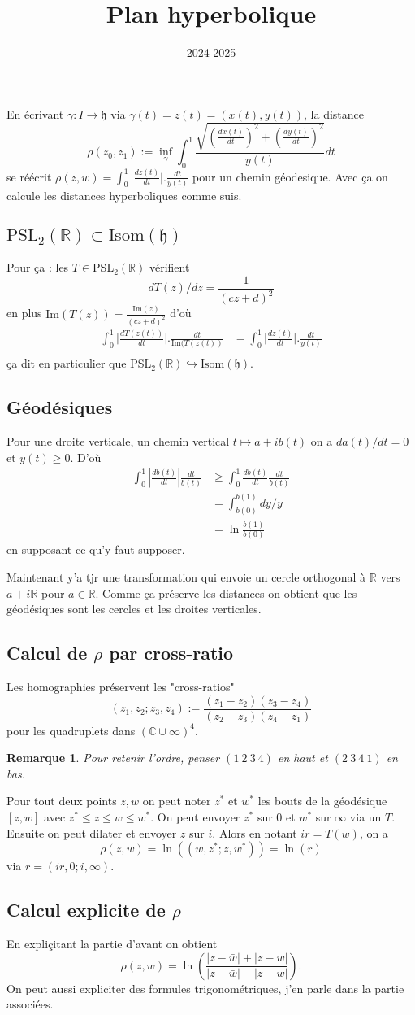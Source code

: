 \documentclass[a4paper,12pt]{article}
\title{Plan hyperbolique}
\date{2024-2025}
\newcommand{\R}{\mathbb{R}}
\newcommand{\C}{\mathbb{C}}
\renewcommand{\Im}{\textrm{Im}}
\newcommand{\PSL}{\textrm{PSL}}
\newcommand{\h}{\mathfrak{h}}
\theoremstyle{plain}
\newtheorem{rem}{Remarque}
\theoremstyle{definition}
\theoremstyle{remark}
\begin{document}
\maketitle
\tableofcontents
En écrivant $\gamma\colon I\to \h$ via $\gamma(t)=z(t)=(x(t),y(t))$,
la distance
\[\rho(z_0,z_1):=\inf_\gamma\int_0^1\frac{\sqrt{\left(\frac{dx(t)}{dt}\right)^2+\left(\frac{dy(t)}{dt}\right)^2}}{y(t)}dt\]
se réécrit $\rho(z,w)=\int_0^1\lvert\frac{dz(t)}{dt}\rvert.\frac{dt}{y(t)}$
pour un chemin géodesique. Avec ça on 
calcule les distances hyperboliques comme suis.

\subsection{$\PSL_2(\R)\subset \textrm{Isom}(\h)$}
Pour ça : les $T\in \PSL_2(\R)$ vérifient 
\[dT(z)/dz=\frac{1}{(cz+d)^2}\]
en plus $\Im(T(z))=\frac{\Im(z)}{(cz+d)^2}$ d'où
\begin{align*}
  \int_0^1\lvert\frac{dT(z(t))}{dt}\rvert.\frac{dt}{\Im(T(z(t))}&=\int_0^1\lvert\frac{dz(t)}{dt}\rvert.\frac{dt}{y(t)}\\
\end{align*}
ça dit en particulier que $\PSL_2(\R)\hookrightarrow
\textrm{Isom}(\h)$. 

\subsection{Géodésiques}
Pour une droite verticale, un chemin vertical
$t\mapsto a+ib(t)$ on a $da(t)/dt=0$ et $y(t)\geq 0$.
D'où
\begin{align*}
\int_0^1|\frac{db(t)}{dt}|\frac{dt}{b(t)}&\geq\int_0^1\frac{db(t)}{dt}\frac{dt}{b(t)}\\
					 &=\int_{b(0)}^{b(1)} dy/y\\
					 &=\ln\frac{b(1)}{b(0)}
\end{align*}
en supposant ce qu'y faut supposer.

Maintenant y'a tjr une transformation qui
envoie un cercle orthogonal à $\R$ vers $a+i\R$ pour
$a\in \R$. Comme
ça préserve les distances on obtient que les géodésiques
sont les cercles et les droites verticales.

\subsection{Calcul de $\rho$ par cross-ratio}
Les homographies préservent les "cross-ratios"
\[(z_1,z_2;z_3,z_4):=\frac{(z_1-z_2)(z_3-z_4)}{(z_2-z_3)(z_4-z_1)}\]
pour les quadruplets dans $(\C\cup\infty)^4$.
\begin{rem}
  Pour retenir l'ordre, penser $(1~2~3~4)$ en haut
  et $(2~3~4~1)$ en bas.
\end{rem}
Pour tout deux points $z,w$ on peut noter $z^*$
et $w^*$ les bouts de la géodésique $[z,w]$ avec
$z^*\leq z\leq w\leq w^*$. On peut envoyer $z^*$ sur
$0$ et $w^*$ sur $\infty$ via un $T$. Ensuite on peut
dilater et envoyer
$z$ sur $i$. Alors en notant $ir=T(w)$, on a
\[\rho(z,w)=\ln((w,z^*;z,w^*))=\ln(r)\]
via $r=(ir,0;i,\infty)$. 

\subsection{Calcul explicite de $\rho$}
En expliçitant la partie d'avant on obtient 
\[\rho(z,w)=\ln(\frac{|z-\bar w|+|z-w|}{|z-\bar w|-|z-w|}).\]
On peut aussi expliciter des formules trigonométriques,
j'en parle dans la partie associées.


\end{document}
